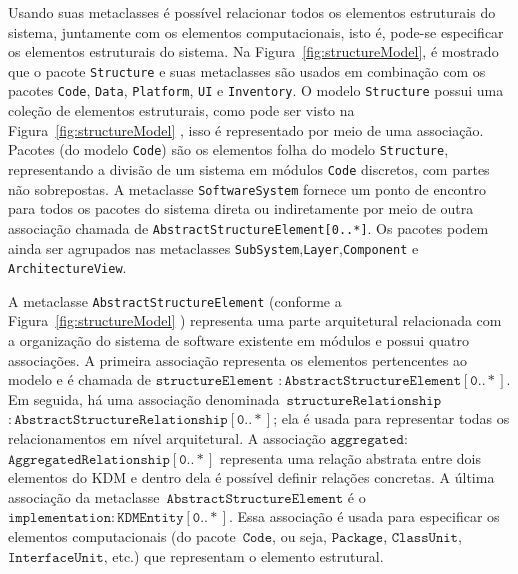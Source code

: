  Usando suas metaclasses é possível relacionar todos os elementos estruturais do sistema, juntamente com os elementos computacionais, isto é, pode-se especificar os elementos estruturais do sistema. Na Figura~\ref{fig:structureModel}, é mostrado que o pacote \texttt{Structure} e suas metaclasses são usados em combinação com os pacotes \texttt{Code}, \texttt{Data}, \texttt{Platform}, \texttt{UI} e \texttt{Inventory}. O modelo \texttt{Structure} possui uma coleção de elementos estruturais, como pode ser visto na Figura~\ref{fig:structureModel} , isso é representado por meio de uma associação. Pacotes (do modelo \texttt{Code}) são os elementos folha do modelo \texttt{Structure}, representando a divisão de um sistema em módulos \texttt{Code} discretos, com partes não sobrepostas. A metaclasse \texttt{SoftwareSystem} fornece um ponto de encontro para todos os pacotes do sistema direta ou indiretamente por meio de outra associação chamada de \texttt{AbstractStructureElement[0..*]}. Os pacotes podem ainda ser agrupados nas metaclasses \texttt{SubSystem},\texttt{Layer},\texttt{Component} e \texttt{ArchitectureView}. 
 
A metaclasse \texttt{AbstractStructureElement} (conforme a Figura~\ref{fig:structureModel} ) representa uma parte arquitetural relacionada com a organização do sistema de software existente em módulos e possui quatro associações. A primeira associação representa os elementos pertencentes ao modelo e é chamada de $\mathtt{structureElement}$ $\mathtt{:AbstractStructureElement[0..*]}$. Em seguida, há uma associação denominada~$\mathtt{structureRelationship}$ $\mathtt{:AbstractStructureRelationship[0..*]}$; ela é usada para representar todas os relacionamentos em nível arquitetural. A associação $\mathtt{aggregated:}$ $\mathtt{AggregatedRelationship[0..*]}$ representa uma relação abstrata entre dois elementos do KDM e dentro dela é possível definir relações concretas. A última associação da metaclasse~$\mathtt{AbstractStructureElement}$ é o~$\mathtt{implementation:KDMEntity[0..*]}$. Essa associação é usada para especificar os elementos computacionais (do pacote~$\mathtt{Code}$, ou seja, $\mathtt{Package}$, $\mathtt{ClassUnit}$, $\mathtt{InterfaceUnit}$, etc.) que representam o elemento estrutural. 

